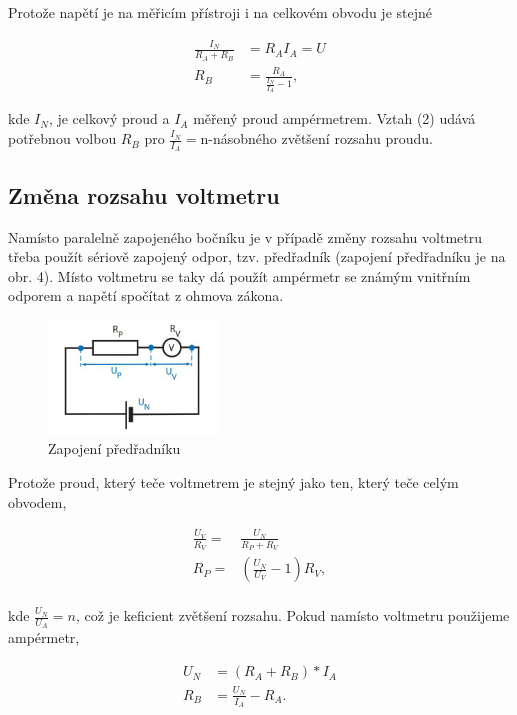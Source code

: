 \documentclass[a4paper,11pt]{article}
\begin{document}
Protože napětí je na měřicím přístroji i na celkovém obvodu je stejné

\begin{align}
  \frac{I_N}{R_A + R_B} &= R_AI_A = U \\
  R_B &= \frac{R_A}{\frac{I_N}{I_A} - 1},
\end{align}

\noindent
kde $I_N$, je celkový proud a $I_A$ měřený proud ampérmetrem. Vztah (2) udává potřebnou volbou $R_B$ pro $\frac{I_N}{I_A}=$n-násobného zvětšení rozsahu proudu.

\subsection{Změna rozsahu voltmetru}

Namísto paralelně zapojeného bočníku je v případě změny rozsahu voltmetru třeba použít sériově
zapojený odpor, tzv. předřadník (zapojení předřadníku je na obr. 4). 
Místo voltmetru se taky dá použít ampérmetr se známým vnitřním odporem a napětí spočítat z ohmova zákona.

\newpage

\begin{figure}[htpb]
  \centering
  \includegraphics[width=0.4\textwidth]{preradnik.jpg}
  \caption{Zapojení předřadníku}
  \label{fig:}
\end{figure}

Protože proud, který teče voltmetrem je stejný jako ten, který teče celým obvodem,

\begin{align}
  \frac{U_V}{R_V} =& \frac{U_N}{R_P + R_V} \\
  R_P =& (\frac{U_N}{U_V} - 1) R_V, \\ 
\end{align}

\noindent
kde $\frac{U_N}{U_A} = n$, což je keficient zvětšení rozsahu. Pokud namísto voltmetru použijeme ampérmetr,

\begin{align}
  U_N &= (R_A + R_B) * I_A \\
  R_B &= \frac{U_N}{I_A} - R_A.
\end{align}
\end{document}
